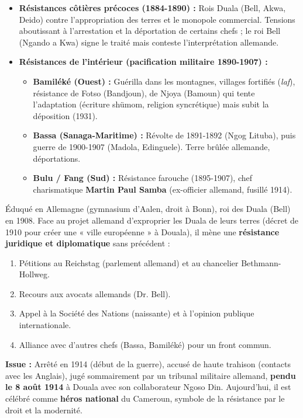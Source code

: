 \documentclass[11pt]{article}
\begin{document}
\begin{itemize}
    \item \textbf{Résistances côtières précoces (1884-1890) :} Rois Duala (Bell, Akwa, Deido) contre l'appropriation des terres et le monopole commercial. Tensions aboutissant à l'arrestation et la déportation de certains chefs ; le roi Bell (Ngando a Kwa) signe le traité mais conteste l'interprétation allemande.
    \item \textbf{Résistances de l'intérieur (pacification militaire 1890-1907) :}
    \begin{itemize}
        \item \textbf{Bamiléké (Ouest) :} Guérilla dans les montagnes, villages fortifiés (\emph{laf}), résistance de Fotso (Bandjoun), de Njoya (Bamoun) qui tente l'adaptation (écriture shümom, religion syncrétique) mais subit la déposition (1931).
        \item \textbf{Bassa (Sanaga-Maritime) :} Révolte de 1891-1892 (Ngog Lituba), puis guerre de 1900-1907 (Madola, Edinguele). Terre brûlée allemande, déportations.
        \item \textbf{Bulu / Fang (Sud) :} Résistance farouche (1895-1907), chef charismatique \textbf{Martin Paul Samba} (ex-officier allemand, fusillé 1914).
    \end{itemize}
\end{itemize}

\begin{savaistu}
Éduqué en Allemagne (gymnasium d'Aalen, droit à Bonn), roi des Duala (Bell) en 1908. Face au projet allemand d'exproprier les Duala de leurs terres (décret de 1910 pour créer une « ville européenne » à Douala), il mène une \textbf{résistance juridique et diplomatique} sans précédent :
\begin{enumerate}
    \item Pétitions au Reichstag (parlement allemand) et au chancelier Bethmann-Hollweg.
    \item Recours aux avocats allemands (Dr. Bell).
    \item Appel à la Société des Nations (naissante) et à l'opinion publique internationale.
    \item Alliance avec d'autres chefs (Bassa, Bamiléké) pour un front commun.
\end{enumerate}
\textbf{Issue :} Arrêté en 1914 (début de la guerre), accusé de haute trahison (contacts avec les Anglais), jugé sommairement par un tribunal militaire allemand, \textbf{pendu le 8 août 1914} à Douala avec son collaborateur Ngoso Din. Aujourd'hui, il est célébré comme \textbf{héros national} du Cameroun, symbole de la résistance par le droit et la modernité.
\end{savaistu}
\end{document}
